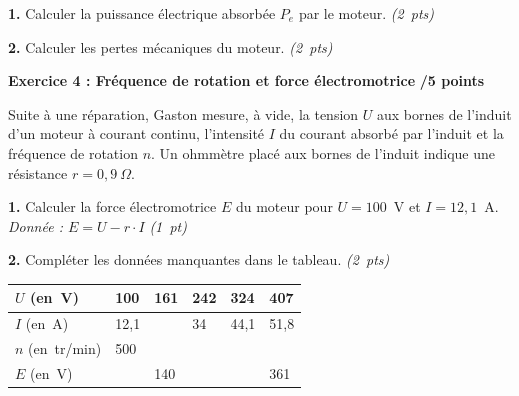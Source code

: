 \documentclass[11pt,a4paper]{article}
\renewcommand{\arraystretch}{1.8}
\newcommand{\cadreblanc}[1]{%
	\medskip\framebox[\linewidth][c]{%
		\rule{0mm}{#1mm}}\par
	\medskip}
\begin{document}
\begin{center}
\end{center}



\textbf{1.} Calculer la puissance électrique absorbée $P_e$ par le moteur. \hfill \textit{(2~pts)}

\cadreblanc{10}

\textbf{2.} Calculer les pertes mécaniques du moteur. \hfill \textit{(2~pts)}

\cadreblanc{20}

\vfill
\newpage

\textbf{Exercice 4 : Fréquence de rotation et force électromotrice}
\hfill \textbf{/5 points}

\vspace{4mm}

Suite à une réparation, Gaston mesure, à vide, la tension $U$ aux bornes de l'induit d'un moteur à courant continu, l'intensité $I$ du courant absorbé par l'induit et la fréquence de rotation $n$. Un ohmmètre placé aux bornes de l'induit indique une résistance $r = 0{,}9~\Omega$.

\vspace{4mm}

\textbf{1.} Calculer la force électromotrice $E$ du moteur pour $U = 100$~V et $I = 12{,}1$~A.
\hfill \textit{Donnée : $E = U - r \cdot I$} \hfill \textit{(1~pt)}

\cadreblanc{12}

\textbf{2.} Compléter les données manquantes dans le tableau. \hfill \textit{(2~pts)}

\vspace{3mm}

\begin{center}
	\renewcommand{\arraystretch}{2.2}
	\begin{tabular}{|l|m{2.2cm}|m{2.2cm}|m{2.2cm}|m{2.2cm}|m{2.2cm}|}
		\hline
		$U$ (en~V) & 100 & 161 & 242 & 324 & 407 \\
		\hline
		$I$ (en~A) & 12,1 & & 34 & 44,1 & 51,8 \\
		\hline
		$n$ (en~tr/min) & 500 & & & & \\
		\hline
		$E$ (en~V) & & 140 & & & 361 \\
		\hline
	\end{tabular}
\end{center}
\end{document}
